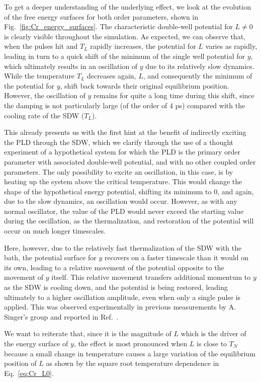 To get a deeper understanding of the underlying effect, we look at the evolution of the free energy surfaces for both order parameters, shown in Fig.~\ref{fig:Cr_energy_surfaces}.
The characteristic double-well potential for $L\neq0$  is clearly visible throughout the simulation.
As expected, we can observe that, when the pulses hit and $T_L$ rapidly increases, the potential for $L$ varies as rapidly, leading in turn to a quick shift of the minimum of the single well potential for $y$, which ultimately results in an oscillation of $y$ due to its relatively slow dynamics.
While the temperature $T_L$ decreases again, $L$, and consequently the minimum of the potential for $y$, shift back towards their original equilibrium position.
However, the oscillation of $y$ remains for quite a long time during this shift, since the damping is not particularly large (of the order of 4 ps) compared with the cooling rate of the \gls{SDW} ($T_L$).

This already presents us with the first hint at the benefit of indirectly exciting the \gls{PLD} through the \gls{SDW}, which we clarify through the use of a thought experiment of a hypothetical system for which the \gls{PLD} is the primary order parameter with associated double-well potential, and with no other coupled order parameters.
The only possibility to excite an oscillation, in this case, is by heating up the system above the critical temperature.
This would change the shape of the hypothetical energy potential, shifting its minimum to 0, and again, due to the slow dynamics, an oscillation would occur.
However, as with any normal oscillator, the value of the \gls{PLD} would never exceed the starting value during the oscillation, as the thermalization, and restoration of the potential will occur on much longer timescales.

Here, however, due to the relatively fast thermalization of the \gls{SDW} with the bath, the potential surface for $y$ recovers on a faster timescale than it would on its own, leading to a relative movement of the potential opposite to the movement of $y$ itself.
This relative movement transfers additional momentum to $y$ as the \gls{SDW} is cooling down, and the potential is being restored, leading ultimately to a higher oscillation amplitude, even when only a single pulse is applied.
This was observed experimentally in previous measurements by A. Singer's group and reported in Ref.~\cite{Singer2015prl}. 

We want to reiterate that, since it is the magnitude of $L$ which is the driver of the energy surface of $y$, the effect is most pronounced when $L$ is close to $T_N$ because a small change in temperature causes a large variation of the equilibrium position of $L$ as shown by the square root temperature dependence in Eq.~\eqref{eq:Cr_L0}.    

